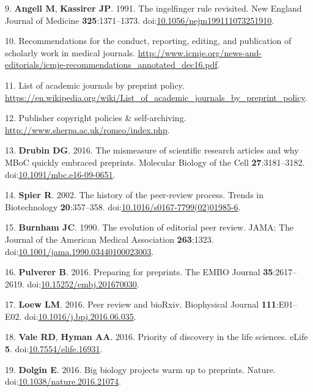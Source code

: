 \documentclass[11pt,]{article}
\begin{document}
\hypertarget{ref-Angell1991}{}
9. \textbf{Angell M}, \textbf{Kassirer JP}. 1991. The ingelfinger rule
revisited. New England Journal of Medicine \textbf{325}:1371--1373.
doi:\href{https://doi.org/10.1056/nejm199111073251910}{10.1056/nejm199111073251910}.

\hypertarget{ref-ICMJE}{}
10. Recommendations for the conduct, reporting, editing, and publication
of scholarly work in medical journals.
\url{http://www.icmje.org/news-and-editorials/icmje-recommendations_annotated_dec16.pdf}.

\hypertarget{ref-PreprintPolicy}{}
11. List of academic journals by preprint policy.
\url{https://en.wikipedia.org/wiki/List_of_academic_journals_by_preprint_policy}.

\hypertarget{ref-Sherpa}{}
12. Publisher copyright policies \& self-archiving.
\url{http://www.sherpa.ac.uk/romeo/index.php}.

\hypertarget{ref-Drubin2016}{}
13. \textbf{Drubin DG}. 2016. The mismeasure of scientific research
articles and why MBoC quickly embraced preprints. Molecular Biology of
the Cell \textbf{27}:3181--3182.
doi:\href{https://doi.org/10.1091/mbc.e16-09-0651}{10.1091/mbc.e16-09-0651}.

\hypertarget{ref-Spier2002}{}
14. \textbf{Spier R}. 2002. The history of the peer-review process.
Trends in Biotechnology \textbf{20}:357--358.
doi:\href{https://doi.org/10.1016/s0167-7799(02)01985-6}{10.1016/s0167-7799(02)01985-6}.

\hypertarget{ref-Burnham1990}{}
15. \textbf{Burnham JC}. 1990. The evolution of editorial peer review.
JAMA: The Journal of the American Medical Association \textbf{263}:1323.
doi:\href{https://doi.org/10.1001/jama.1990.03440100023003}{10.1001/jama.1990.03440100023003}.

\hypertarget{ref-Pulverer2016}{}
16. \textbf{Pulverer B}. 2016. Preparing for preprints. The EMBO Journal
\textbf{35}:2617--2619.
doi:\href{https://doi.org/10.15252/embj.201670030}{10.15252/embj.201670030}.

\hypertarget{ref-Loew2016}{}
17. \textbf{Loew LM}. 2016. Peer review and bioRxiv. Biophysical Journal
\textbf{111}:E01--E02.
doi:\href{https://doi.org/10.1016/j.bpj.2016.06.035}{10.1016/j.bpj.2016.06.035}.

\hypertarget{ref-Vale2016}{}
18. \textbf{Vale RD}, \textbf{Hyman AA}. 2016. Priority of discovery in
the life sciences. eLife \textbf{5}.
doi:\href{https://doi.org/10.7554/elife.16931}{10.7554/elife.16931}.

\hypertarget{ref-Dolgin2016}{}
19. \textbf{Dolgin E}. 2016. Big biology projects warm up to preprints.
Nature.
doi:\href{https://doi.org/10.1038/nature.2016.21074}{10.1038/nature.2016.21074}.
\end{document}
